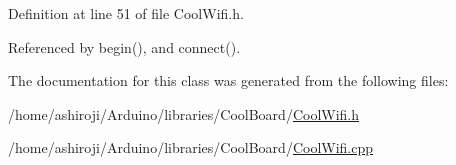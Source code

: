 Definition at line 51 of file Cool\+Wifi.\+h.



Referenced by begin(), and connect().



The documentation for this class was generated from the following files\+:\begin{DoxyCompactItemize}
\item 
/home/ashiroji/\+Arduino/libraries/\+Cool\+Board/\hyperlink{CoolWifi_8h}{Cool\+Wifi.\+h}\item 
/home/ashiroji/\+Arduino/libraries/\+Cool\+Board/\hyperlink{CoolWifi_8cpp}{Cool\+Wifi.\+cpp}\end{DoxyCompactItemize}
